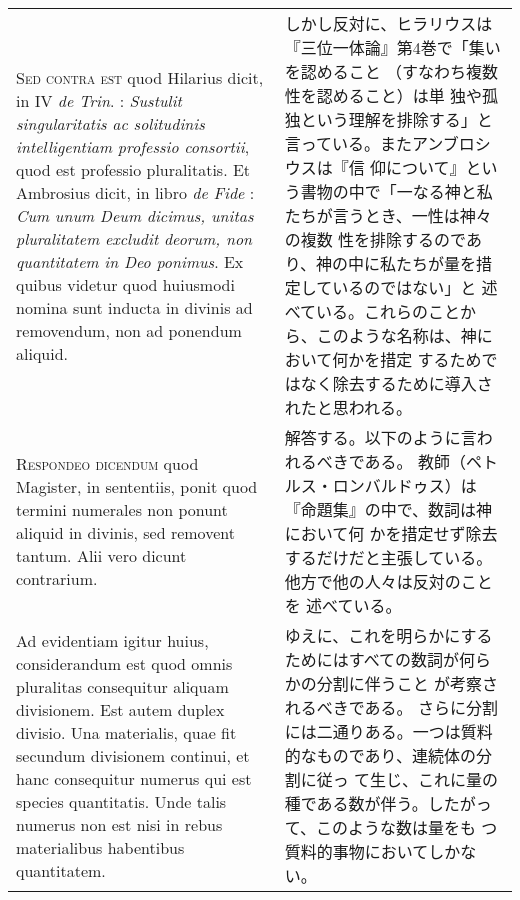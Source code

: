 \documentclass[10pt]{jsarticle} %
\begin{document}
\begin{longtable}{p{21em}p{21em}}
\\



{\scshape Sed contra est} quod Hilarius dicit, in IV {\itshape de
 Trin}. : {\itshape Sustulit
singularitatis ac solitudinis intelligentiam professio consortii}, quod
est professio pluralitatis. Et Ambrosius dicit, in libro {\itshape de
 Fide} : {\itshape Cum
unum Deum dicimus, unitas pluralitatem excludit deorum, non
quantitatem in Deo ponimus}. Ex quibus videtur quod huiusmodi nomina
sunt inducta in divinis ad removendum, non ad ponendum aliquid.

&

しかし反対に、ヒラリウスは『三位一体論』第4巻で「集いを認めること
 （すなわち複数性を認めること）は単
 独や孤独という理解を排除する」と言っている。またアンブロシウスは『信
 仰について』という書物の中で「一なる神と私たちが言うとき、一性は神々の複数
 性を排除するのであり、神の中に私たちが量を措定しているのではない」と
 述べている。これらのことから、このような名称は、神において何かを措定
 するためではなく除去するために導入されたと思われる。


\\



{\scshape Respondeo dicendum} quod Magister, in sententiis, ponit quod termini
numerales non ponunt aliquid in divinis, sed removent tantum. Alii
vero dicunt contrarium. 


&

解答する。以下のように言われるべきである。
教師（ペトルス・ロンバルドゥス）は『命題集』の中で、数詞は神において何
 かを措定せず除去するだけだと主張している。他方で他の人々は反対のことを
 述べている。


\\

Ad evidentiam igitur huius, considerandum est
quod omnis pluralitas consequitur aliquam divisionem. 
Est autem duplex
divisio. Una materialis, quae fit secundum divisionem continui, et
hanc consequitur numerus qui est species quantitatis. Unde talis
numerus non est nisi in rebus materialibus habentibus
quantitatem. 


&

ゆえに、これを明らかにするためにはすべての数詞が何らかの分割に伴うこと
 が考察されるべきである。
さらに分割には二通りある。一つは質料的なものであり、連続体の分割に従っ
 て生じ、これに量の種である数が伴う。したがって、このような数は量をも
 つ質料的事物においてしかない。




\end{longtable}
\end{document}
